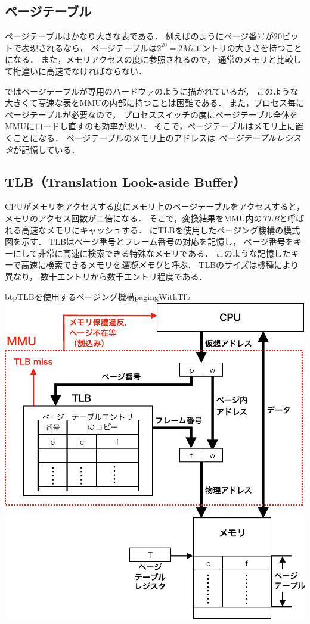 \subsection{ページテーブル}
ページテーブルはかなり大きな表である．
例えばのようにページ番号が20ビットで表現されるなら，
ページテーブルは$2^{20}=2Mi$エントリの大きさを持つことになる．
また，メモリアクセスの度に参照されるので，
通常のメモリと比較して桁違いに高速でなければならない．

ではページテーブルが専用のハードウァのように描かれているが，
このような大きくて高速な表をMMUの内部に持つことは困難である．
また，プロセス毎にページテーブルが必要なので，
プロセススイッチの度にページテーブル全体をMMUにロードし直すのも効率が悪い．
そこで，ページテーブルはメモリ上に置くことになる．
ページテーブルのメモリ上のアドレスは
\emph{ページテーブルレジスタ}が記憶している．

\subsection{TLB（Translation Look-aside Buffer）}
CPUがメモリをアクセスする度にメモリ上のページテーブルをアクセスすると，
メモリのアクセス回数が二倍になる．
そこで，変換結果をMMU内の\emph{TLB}と呼ばれる高速なメモリにキャッシュする．
にTLBを使用したページング機構の模式図を示す．
TLBはページ番号とフレーム番号の対応を記憶し，
ページ番号をキーにして非常に高速に検索できる特殊なメモリである．
このような記憶したキーで高速に検索できるメモリを\emph{連想メモリ}と呼ぶ．
TLBのサイズは機種により異なり，
数十エントリから数千エントリ程度である．

\begin{myfig}{btp}{TLBを使用するページング機構}{pagingWithTlb}
  \includegraphics[scale=0.66]{Fig/pagingWithTlb-crop.pdf}
\end{myfig}

